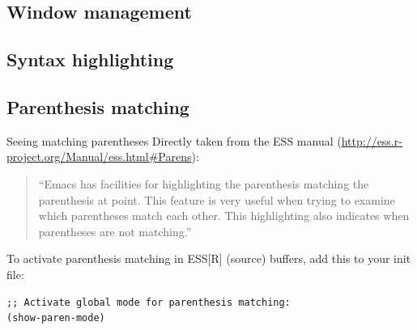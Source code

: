 \documentclass[presentation]{beamer}
\begin{document}
\subsection{Window management}
\label{sec:org2f428ca}
\subsection{Syntax highlighting}
\label{sec:org306edaf}
\subsection{Parenthesis matching}
\label{sec:orgd80be8a}
\begin{frame}[label={sec:orgdbe15a6},fragile]{Seeing matching parentheses}
 Directly taken from the ESS manual (\url{http://ess.r-project.org/Manual/ess.html\#Parens}):

\begin{quote}
``Emacs has facilities for highlighting the parenthesis matching the parenthesis at point. This feature is very useful when trying to examine which parentheses match each other. This highlighting also indicates when parentheses are not matching.''
\end{quote}

To activate parenthesis matching in ESS[R] (source) buffers, add this to your init file:

\begin{verbatim}
;; Activate global mode for parenthesis matching:
(show-paren-mode)
\end{verbatim}
\end{frame}
\end{document}
